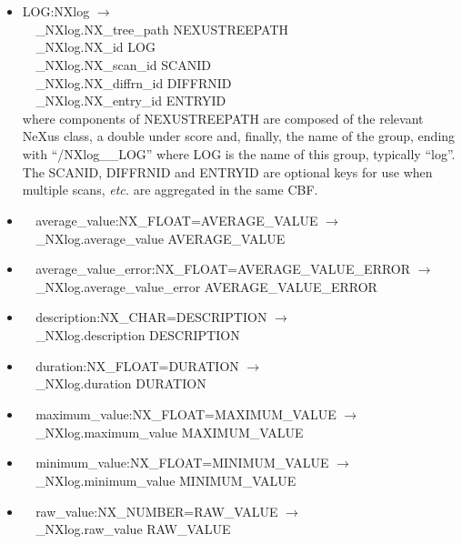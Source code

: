 \documentclass[11pt]{article}
\begin{document}
{{\begin{itemize}

\item{LOG:NXlog $\rightarrow$\\
\verb|  |\_NXlog.NX\_tree\_path    NEXUSTREEPATH \\
\verb|  |\_NXlog.NX\_id            LOG\\
\verb|  |\_NXlog.NX\_scan\_id      SCANID \\
\verb|  |\_NXlog.NX\_diffrn\_id    DIFFRNID \\
\verb|  |\_NXlog.NX\_entry\_id     ENTRYID \\
where components of NEXUSTREEPATH are composed of the
relevant NeXus class, a double under score and, finally, the
name of the group, ending with ``/NXlog\_\_LOG''
where LOG is the name of this group, typically ``log''.
The SCANID, DIFFRNID and ENTRYID are optional keys for use
when multiple scans, {\it etc.} are aggregated in the same CBF.}

\item{\verb|  |average\_value:NX\_FLOAT=AVERAGE\_VALUE $\rightarrow$\\
\verb|  |\_NXlog.average\_value AVERAGE\_VALUE}

\item{\verb|  |average\_value\_error:NX\_FLOAT=AVERAGE\_VALUE\_ERROR $\rightarrow$\\
\verb|  |\_NXlog.average\_value\_error AVERAGE\_VALUE\_ERROR}

\item{\verb|  |description:NX\_CHAR=DESCRIPTION $\rightarrow$\\
\verb|  |\_NXlog.description DESCRIPTION}

\item{\verb|  |duration:NX\_FLOAT=DURATION $\rightarrow$\\
\verb|  |\_NXlog.duration DURATION}

\item{\verb|  |maximum\_value:NX\_FLOAT=MAXIMUM\_VALUE $\rightarrow$\\
\verb|  |\_NXlog.maximum\_value MAXIMUM\_VALUE}

\item{\verb|  |minimum\_value:NX\_FLOAT=MINIMUM\_VALUE $\rightarrow$\\
\verb|  |\_NXlog.minimum\_value MINIMUM\_VALUE}

\item{\verb|  |raw\_value:NX\_NUMBER=RAW\_VALUE $\rightarrow$\\
\verb|  |\_NXlog.raw\_value RAW\_VALUE}


\end{itemize}}}
\end{document}
